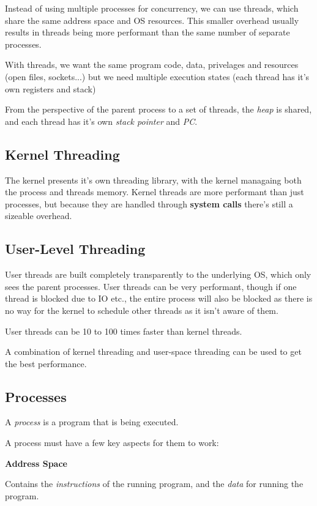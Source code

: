 \documentclass{article}
\begin{document}
Instead of using multiple processes for concurrency, we can use threads, which share the same address
space and OS resources. This smaller overhead usually results in threads being more performant than
the same number of separate processes.

With threads, we want the same program code, data, privelages and resources (open files, sockets...) but
we need multiple execution states (each thread has it's own registers and stack)

From the perspective of the parent process to a set of threads, the \emph{heap} is shared, and each thread has
it's own \emph{stack pointer} and \emph{PC}.

\subsection{Kernel Threading}

The kernel presents it's own threading library, with the kernel managaing both the process and threads memory.
Kernel threads are more performant than just processes, but because they are handled through \textbf{system calls}
there's still a sizeable overhead.

\subsection{User-Level Threading}

User threads are built completely transparently to the underlying OS, which only sees the parent processes. User
threads can be very performant, though if one thread is blocked due to IO etc., the entire process will also be
blocked as there is no way for the kernel to schedule other threads as it isn't aware of them.

User threads can be 10 to 100 times faster than kernel threads.

A combination of kernel threading and user-space threading can be used to get the best performance.


\filbreak
\subsection{Processes}

A \textit{process} is a program that is being executed.

A process must have a few key aspects for them to work:

\textbf{Address Space}

Contains the \textit{instructions} of the running program, and the \textit{data} for running the program.
\end{document}
